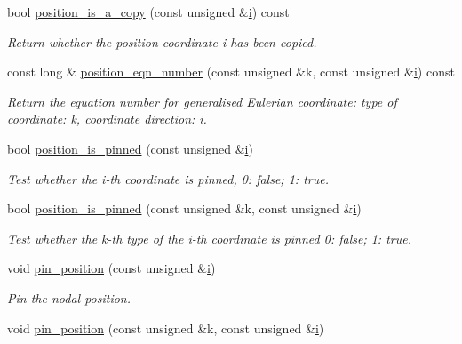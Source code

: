 \begin{DoxyCompactItemize}
bool \hyperlink{classoomph_1_1SolidNode_aa20d88cc797c6635bfd634376c177d87}{position\+\_\+is\+\_\+a\+\_\+copy} (const unsigned \&\hyperlink{cfortran_8h_adb50e893b86b3e55e751a42eab3cba82}{i}) const
\begin{DoxyCompactList}\small\item\em Return whether the position coordinate i has been copied. \end{DoxyCompactList}\item 
const long \& \hyperlink{classoomph_1_1SolidNode_a8c95f20a479d12604eb083cb01149711}{position\+\_\+eqn\+\_\+number} (const unsigned \&k, const unsigned \&\hyperlink{cfortran_8h_adb50e893b86b3e55e751a42eab3cba82}{i}) const
\begin{DoxyCompactList}\small\item\em Return the equation number for generalised Eulerian coordinate\+: type of coordinate\+: k, coordinate direction\+: i. \end{DoxyCompactList}\item 
bool \hyperlink{classoomph_1_1SolidNode_afd8204156be2ff0fa40834ca35daf243}{position\+\_\+is\+\_\+pinned} (const unsigned \&\hyperlink{cfortran_8h_adb50e893b86b3e55e751a42eab3cba82}{i})
\begin{DoxyCompactList}\small\item\em Test whether the i-\/th coordinate is pinned, 0\+: false; 1\+: true. \end{DoxyCompactList}\item 
bool \hyperlink{classoomph_1_1SolidNode_af7254744691474f94df8ae3f4b75da38}{position\+\_\+is\+\_\+pinned} (const unsigned \&k, const unsigned \&\hyperlink{cfortran_8h_adb50e893b86b3e55e751a42eab3cba82}{i})
\begin{DoxyCompactList}\small\item\em Test whether the k-\/th type of the i-\/th coordinate is pinned 0\+: false; 1\+: true. \end{DoxyCompactList}\item 
void \hyperlink{classoomph_1_1SolidNode_aa283a553b0141e859dd7b4f80bb88e6d}{pin\+\_\+position} (const unsigned \&\hyperlink{cfortran_8h_adb50e893b86b3e55e751a42eab3cba82}{i})
\begin{DoxyCompactList}\small\item\em Pin the nodal position. \end{DoxyCompactList}\item 
void \hyperlink{classoomph_1_1SolidNode_ad4fefc1c7f3bb6f17ab39ce934bddaf6}{pin\+\_\+position} (const unsigned \&k, const unsigned \&\hyperlink{cfortran_8h_adb50e893b86b3e55e751a42eab3cba82}{i})

\end{DoxyCompactItemize}
